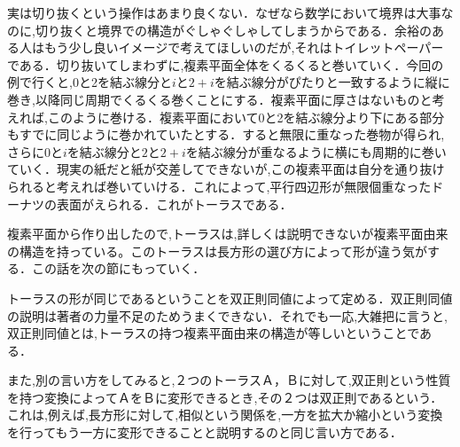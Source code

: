 実は切り抜くという操作はあまり良くない．なぜなら数学において境界は大事なのに,切り抜くと境界での構造がぐしゃぐしゃしてしまうからである．余裕のある人はもう少し良いイメージで考えてほしいのだが,それはトイレットペーパーである．切り抜いてしまわずに,複素平面全体をくるくると巻いていく．今回の例で行くと,0と2を結ぶ線分と$i$と$2+i$を結ぶ線分がぴたりと一致するように縦に巻き,以降同じ周期でくるくる巻くことにする．複素平面に厚さはないものと考えれば,このように巻ける．複素平面において0と2を結ぶ線分より下にある部分もすでに同じように巻かれていたとする．すると無限に重なった巻物が得られ,さらに$0$と$i$を結ぶ線分と$2$と$2+i$を結ぶ線分が重なるように横にも周期的に巻いていく．現実の紙だと紙が交差してできないが,この複素平面は自分を通り抜けられると考えれば巻いていける．これによって,平行四辺形が無限個重なったドーナツの表面がえられる．これがトーラスである．

複素平面から作り出したので,トーラスは,詳しくは説明できないが複素平面由来の構造を持っている。このトーラスは長方形の選び方によって形が違う気がする．この話を次の節にもっていく．

トーラスの形が同じであるということを双正則同値によって定める．双正則同値の説明は著者の力量不足のためうまくできない．それでも一応,大雑把に言うと,双正則同値とは,トーラスの持つ複素平面由来の構造が等しいということである．

また,別の言い方をしてみると,２つのトーラスＡ，Ｂに対して,双正則という性質を持つ変換によってＡをＢに変形できるとき,その２つは双正則であるという．これは,例えば,長方形に対して,相似という関係を,一方を拡大か縮小という変換を行ってもう一方に変形できることと説明するのと同じ言い方である．

